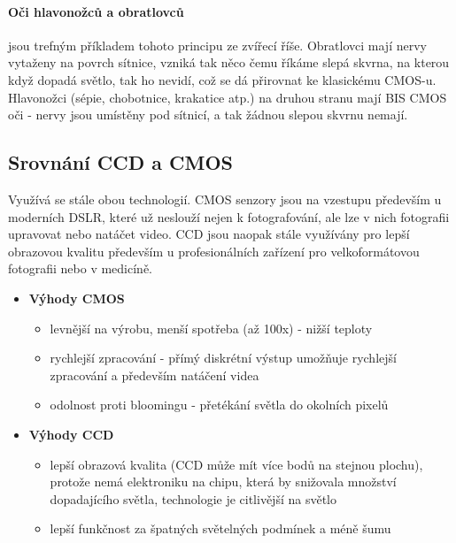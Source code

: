 \documentclass[12pt,a4paper,titlepage,final]{report}
\begin{document}
\paragraph{Oči hlavonožců a obratlovců} jsou trefným příkladem tohoto principu ze zvířecí říše. Obratlovci mají nervy vytaženy na povrch sítnice, vzniká tak něco čemu říkáme slepá skvrna, na kterou když dopadá světlo, tak ho nevidí, což se dá přirovnat ke klasickému CMOS-u. Hlavonožci (sépie, chobotnice, krakatice atp.) na druhou stranu mají BIS CMOS oči - nervy jsou umístěny pod sítnicí, a tak žádnou slepou skvrnu nemají.

\subsection{Srovnání CCD a CMOS}\label{subsec:srovnani-ccd-cmos}

Využívá se stále obou technologií. CMOS senzory jsou na vzestupu především u moderních DSLR, které už neslouží nejen k fotografování, ale lze v nich fotografii upravovat nebo natáčet video. CCD jsou naopak stále využívány pro lepší obrazovou kvalitu především u profesionálních zařízení pro velkoformátovou fotografii nebo v medicíně.

\begin{itemize}
	    	\item \textbf{Výhody CMOS}				
	    	\begin{itemize}
				\item levnější na výrobu, menší spotřeba (až 100x) - nižší teploty
				\item rychlejší zpracování - přímý diskrétní výstup umožňuje rychlejší zpracování a především natáčení videa
				\item odolnost proti bloomingu - přetékání světla do okolních pixelů
	    	\end{itemize}

			\item \textbf{Výhody CCD}
			\begin{itemize}
				\item lepší obrazová kvalita (CCD může mít více bodů na stejnou plochu), protože nemá elektroniku na chipu, která by snižovala množství dopadajícího světla, technologie je citlivější na světlo
				\item lepší funkčnost za špatných světelných podmínek a méně šumu
				
			\end{itemize}
		\end{itemize}	
\end{document}
